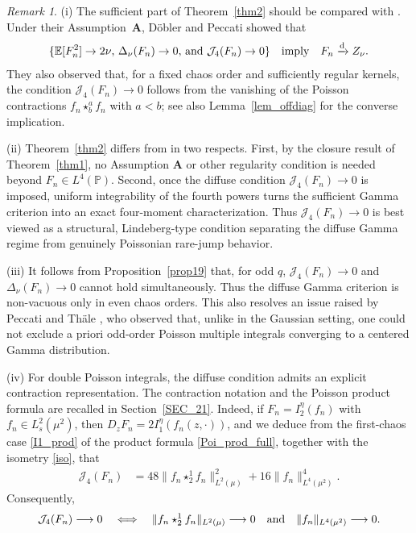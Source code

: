 \documentclass[letterpaper,11pt,reqno]{amsart}
\numberwithin{equation}{section}
\theoremstyle{plain}
\theoremstyle{definition}
\theoremstyle{remark}
\newtheorem{remark}[theorem]{Remark}
\newcommand{\E}{\mathbb{E}}
\newcommand{\PP}{\mathbb{P}}
\newcommand{\noi}{\noindent}
\newcommand{\Jfour}{\mathcal J_4}
\newcommand{\Del}{\Delta}
\newcommand{\AND}{\quad{\rm and}\quad}
\begin{document}
\begin{remark}\rm
(i)
The sufficient part of Theorem~\ref{thm2} should be compared
with \cite[Theorem~1.7 and Remark~1.8(b)]{DP18b}.  Under their
Assumption~$\mathbf A$, D\"obler and Peccati showed that
\noi
\begin{align*}
\{ \text{$\E[F_n^2]\to2\nu$,
$ \Del_\nu(F_n)\to 0,$
and
 $\Jfour(F_n)\to 0$}\} 
 \quad
 \text{imply}
 \quad \text{$F_n\xrightarrow{\mathrm d}Z_\nu$}.
\end{align*}
They also observed that, for
a fixed chaos order and sufficiently regular kernels, the condition
$\Jfour(F_n)\to0$ follows from the vanishing of the Poisson
contractions $f_n\star_b^a f_n$ with $a<b$;
see also Lemma~\ref{lem_offdiag} for the converse implication.

(ii)
Theorem~\ref{thm2} differs from
\cite[Theorem~1.7]{DP18b} in two respects.  First, by the
closure result of Theorem~\ref{thm1}, no Assumption
$\mathbf A$ or other regularity condition is needed beyond
$F_n\in L^4(\PP)$.  Second, once the diffuse condition
$\Jfour(F_n)\to0$ is imposed, uniform integrability of the fourth
powers turns the sufficient Gamma criterion into an exact
four-moment characterization.  Thus $\Jfour(F_n)\to0$ is best viewed
as a structural, Lindeberg-type condition separating the diffuse
Gamma regime from genuinely Poissonian rare-jump behavior.

(iii) It follows from Proposition~\ref{prop19} that, for odd $q$,
$\Jfour(F_n)\to0$ and $\Del_\nu(F_n)\to0$ cannot hold simultaneously.
Thus the diffuse Gamma criterion is non-vacuous only in even chaos
orders.  This also resolves an  issue raised by Peccati and
Th\"ale \cite[Remark~2.8(iii)]{PT13}, who observed that,
unlike in the Gaussian setting, one could not exclude a priori
odd-order Poisson multiple integrals converging to a centered Gamma
distribution.

(iv) For double Poisson integrals, the diffuse condition admits an
explicit contraction representation.  The contraction notation and
the Poisson product formula are recalled in Section~\ref{SEC_21}.
Indeed, if $F_n=I_2^\eta(f_n)$ with $f_n\in L^2_s(\mu^2)$, then
$D_zF_n=2I_1^\eta(f_n(z,\cdot))$, and we deduce from the first-chaos
case \eqref{I1_prod} of the product formula \eqref{Poi_prod_full},
together with the isometry \eqref{iso}, that
\noi
\begin{align*}
 \Jfour(F_n)
 &=
 48\|f_n\star_2^1 f_n\|_{L^2(\mu)}^2
 +
 16\|f_n\|_{L^4(\mu^2)}^4.
\end{align*}
Consequently,
\noi
\begin{align*}
 \Jfour(F_n)\longrightarrow0
 \quad\Longleftrightarrow\quad
 \|f_n\star_2^1f_n\|_{L^2(\mu)}\longrightarrow0
 \AND
 \|f_n\|_{L^4(\mu^2)}\longrightarrow0.
\end{align*}


\end{remark}
\end{document}
